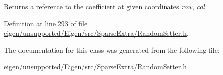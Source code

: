 \begin{DoxyReturn}{Returns}
a reference to the coefficient at given coordinates {\itshape row}, {\itshape col} 
\end{DoxyReturn}


Definition at line \hyperlink{eigen_2unsupported_2_eigen_2src_2_sparse_extra_2_random_setter_8h_source_l00293}{293} of file \hyperlink{eigen_2unsupported_2_eigen_2src_2_sparse_extra_2_random_setter_8h_source}{eigen/unsupported/\+Eigen/src/\+Sparse\+Extra/\+Random\+Setter.\+h}.



The documentation for this class was generated from the following file\+:\begin{DoxyCompactItemize}
\item 
eigen/unsupported/\+Eigen/src/\+Sparse\+Extra/\+Random\+Setter.\+h\end{DoxyCompactItemize}
